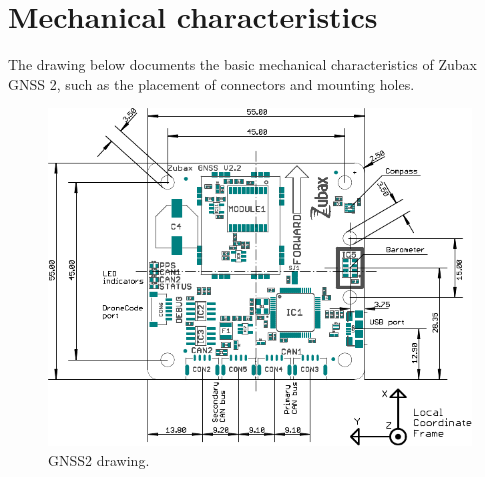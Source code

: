 \documentclass{zubaxdoc}
\begin{document}
\chapter{Mechanical characteristics}\label{sec:mechanical}

The drawing below documents the basic mechanical characteristics of Zubax GNSS 2,
such as the placement of connectors and mounting holes.

\begin{figure}[!hbt]
    \center
	\includegraphics[width=1\textwidth]{GNSS2_drawing}
	\caption{GNSS2 drawing.\label{drawing}}
\end{figure}
\end{document}
